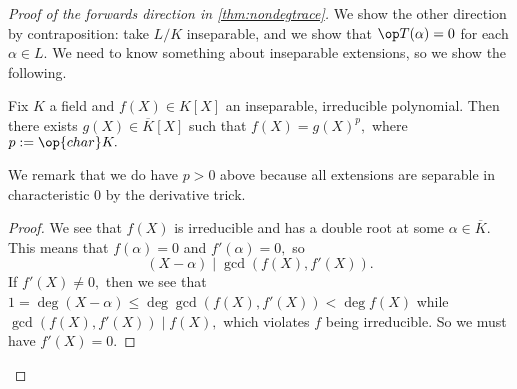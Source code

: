 \begin{proof}[Proof of the forwards direction in \autoref{thm:nondegtrace}]
	We show the other direction by contraposition: take $L/K$ inseparable, and we show that $\op T(\alpha)=0$ for each $\alpha\in L.$ We need to know something about inseparable extensions, so we show the following.
	\begin{lemma} \label{lem:inseptheory}
		Fix $K$ a field and $f(X)\in K[X]$ an inseparable, irreducible polynomial. Then there exists $g(X)\in\overline K[X]$ such that $f(X)=g(X)^p,$ where $p:=\op{char}K.$
	\end{lemma}
	We remark that we do have $p>0$ above because all extensions are separable in characteristic $0$ by the derivative trick.
	\begin{proof}
		We see that $f(X)$ is irreducible and has a double root at some $\alpha\in\overline K.$ This means that $f(\alpha)=0$ and $f'(\alpha)=0,$ so
		\[(X-\alpha)\mid\gcd(f(X),f'(X)).\]
		If $f'(X)\ne0,$ then we see that $1=\deg(X-\alpha)\le\deg\gcd(f(X),f'(X))<\deg f(X)$ while $\gcd(f(X),f'(X))\mid f(X),$ which violates $f$ being irreducible. So we must have $f'(X)=0.$


\end{proof}
\end{proof}
